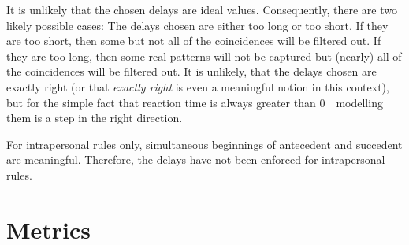 It is unlikely that the chosen delays are ideal values.
Consequently, there are two likely possible cases:
The delays chosen are either too long or too short.
If they are too short, then some but not all of the coincidences will be filtered out.
If they are too long, then some real patterns will not be captured but (nearly) all of the coincidences will be filtered out.
It is unlikely, that the delays chosen are exactly right (or that \emph{exactly right} is even a meaningful notion in this context), but for the simple fact that reaction time is always greater than 0~\ms\ modelling them is a step in the right direction.

For intrapersonal rules only, simultaneous beginnings of antecedent and succedent are meaningful.
Therefore, the delays have not been enforced for intrapersonal rules.


\section{Metrics}
\label{sec:fpmmetr}

